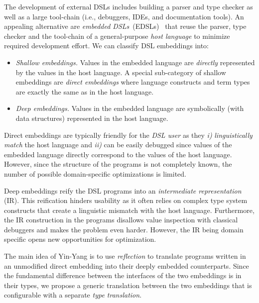 \documentclass{llncs}
\newcommand{\tool}{Yin-Yang\xspace}
\begin{document}
The development of external DSLs includes building a parser and type checker as well as a large tool-chain (i.e., debuggers, IDEs, and documentation tools). An appealing alternative are \emph{embedded DSLs}~(EDSLs)~\cite{Hudak96csur} that reuse the parser, type checker and the tool-chain of a general-purpose \emph{host language} to minimize required development effort. We can classify DSL embeddings into:

\begin{itemize}

\item \emph{Shallow embeddings.} Values in the embedded language are \emph{directly} represented by the values in the host language. A special sub-category of shallow embeddings are \emph{direct embeddings} where language constructs and term types are exactly the same as in the host language.

\item \emph{Deep embeddings.}  Values in the embedded language are symbolically (with data structures) represented in the host language.

\end{itemize}

Direct embeddings are typically friendly for the \emph{DSL user} as they \emph{i)} \emph{linguistically match} the host language and \emph{ii)} can be easily debugged since values of the embedded language directly correspond to the values of the host language. However, since the structure of the programs is not completely known, the number of possible domain-specific optimizations is limited.

Deep embeddings reify the DSL programs into an \emph{intermediate representation} (IR). This reification hinders usability as it often relies on complex type system constructs that create a linguistic mismatch with the host language. Furthermore, the IR construction in the programs disallows value inspection with classical debuggers and makes the problem even harder. However, the IR being domain specific opens new opportunities for optimization.


The main idea of \tool is to use \emph{reflection} to translate programs
written in an unmodified direct embedding into their deeply embedded
counterparts.  Since the fundamental difference between the interfaces of the
two embeddings is in their types, we propose a generic translation between
the two embeddings that is configurable with a separate \emph{type
translation}.
\end{document}
